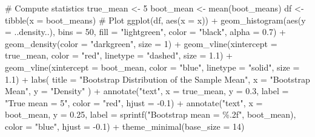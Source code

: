 \documentclass[
  letterpaper,
  DIV=11,
  numbers=noendperiod]{scrreprt}
\newenvironment{Shaded}{\begin{snugshade}}{\end{snugshade}}
\newcommand{\AttributeTok}[1]{\textcolor[rgb]{0.40,0.45,0.13}{#1}}
\newcommand{\CommentTok}[1]{\textcolor[rgb]{0.37,0.37,0.37}{#1}}
\newcommand{\DecValTok}[1]{\textcolor[rgb]{0.68,0.00,0.00}{#1}}
\newcommand{\FloatTok}[1]{\textcolor[rgb]{0.68,0.00,0.00}{#1}}
\newcommand{\FunctionTok}[1]{\textcolor[rgb]{0.28,0.35,0.67}{#1}}
\newcommand{\NormalTok}[1]{\textcolor[rgb]{0.00,0.23,0.31}{#1}}
\newcommand{\OtherTok}[1]{\textcolor[rgb]{0.00,0.23,0.31}{#1}}
\newcommand{\SpecialCharTok}[1]{\textcolor[rgb]{0.37,0.37,0.37}{#1}}
\newcommand{\StringTok}[1]{\textcolor[rgb]{0.13,0.47,0.30}{#1}}
\begin{document}
\begin{tcolorbox}
\begin{Shaded}
\begin{Highlighting}[]
\CommentTok{\# Compute statistics}
\NormalTok{true\_mean }\OtherTok{\textless{}{-}} \DecValTok{5}
\NormalTok{boot\_mean }\OtherTok{\textless{}{-}} \FunctionTok{mean}\NormalTok{(boot\_means)}
\NormalTok{df }\OtherTok{\textless{}{-}} \FunctionTok{tibble}\NormalTok{(}\AttributeTok{x =}\NormalTok{ boot\_means)}
\CommentTok{\# Plot}
\FunctionTok{ggplot}\NormalTok{(df, }\FunctionTok{aes}\NormalTok{(}\AttributeTok{x =}\NormalTok{ x)) }\SpecialCharTok{+}
  \FunctionTok{geom\_histogram}\NormalTok{(}\FunctionTok{aes}\NormalTok{(}\AttributeTok{y =}\NormalTok{ ..density..), }\AttributeTok{bins =} \DecValTok{50}\NormalTok{, }
                 \AttributeTok{fill =} \StringTok{"lightgreen"}\NormalTok{, }\AttributeTok{color =} \StringTok{"black"}\NormalTok{, }\AttributeTok{alpha =} \FloatTok{0.7}\NormalTok{) }\SpecialCharTok{+}
  \FunctionTok{geom\_density}\NormalTok{(}\AttributeTok{color =} \StringTok{"darkgreen"}\NormalTok{, }\AttributeTok{size =} \DecValTok{1}\NormalTok{) }\SpecialCharTok{+}
  \FunctionTok{geom\_vline}\NormalTok{(}\AttributeTok{xintercept =}\NormalTok{ true\_mean, }\AttributeTok{color =} \StringTok{"red"}\NormalTok{, }\AttributeTok{linetype =} \StringTok{"dashed"}\NormalTok{, }\AttributeTok{size =} \FloatTok{1.1}\NormalTok{) }\SpecialCharTok{+}
  \FunctionTok{geom\_vline}\NormalTok{(}\AttributeTok{xintercept =}\NormalTok{ boot\_mean, }\AttributeTok{color =} \StringTok{"blue"}\NormalTok{, }\AttributeTok{linetype =} \StringTok{"solid"}\NormalTok{, }\AttributeTok{size =} \FloatTok{1.1}\NormalTok{) }\SpecialCharTok{+}
  \FunctionTok{labs}\NormalTok{(}
    \AttributeTok{title =} \StringTok{"Bootstrap Distribution of the Sample Mean"}\NormalTok{,}
    \AttributeTok{x =} \StringTok{"Bootstrap Mean"}\NormalTok{,}
    \AttributeTok{y =} \StringTok{"Density"}
\NormalTok{  ) }\SpecialCharTok{+}
  \FunctionTok{annotate}\NormalTok{(}\StringTok{"text"}\NormalTok{, }\AttributeTok{x =}\NormalTok{ true\_mean, }\AttributeTok{y =} \FloatTok{0.3}\NormalTok{, }\AttributeTok{label =} \StringTok{"True mean = 5"}\NormalTok{, }\AttributeTok{color =} \StringTok{"red"}\NormalTok{, }\AttributeTok{hjust =} \SpecialCharTok{{-}}\FloatTok{0.1}\NormalTok{) }\SpecialCharTok{+}
  \FunctionTok{annotate}\NormalTok{(}\StringTok{"text"}\NormalTok{, }\AttributeTok{x =}\NormalTok{ boot\_mean, }\AttributeTok{y =} \FloatTok{0.25}\NormalTok{, }\AttributeTok{label =} \FunctionTok{sprintf}\NormalTok{(}\StringTok{"Bootstrap mean = \%.2f"}\NormalTok{, boot\_mean),}
           \AttributeTok{color =} \StringTok{"blue"}\NormalTok{, }\AttributeTok{hjust =} \SpecialCharTok{{-}}\FloatTok{0.1}\NormalTok{) }\SpecialCharTok{+}
  \FunctionTok{theme\_minimal}\NormalTok{(}\AttributeTok{base\_size =} \DecValTok{14}\NormalTok{)}
\end{Highlighting}
\end{Shaded}


\end{tcolorbox}
\end{document}
